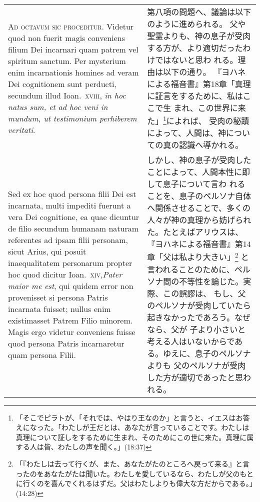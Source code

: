 \documentclass[10pt]{jsarticle} %
\begin{document}
\begin{longtable}{p{21em}p{21em}}

{\Huge A}{\scshape d octavum sic proceditur}. Videtur quod non fuerit magis conveniens
filium Dei incarnari quam patrem vel spiritum sanctum. Per mysterium
enim incarnationis homines ad veram Dei cognitionem sunt perducti,
secundum illud Ioan.~{\scshape xviii}, {\itshape in hoc natus sum, et ad hoc veni in mundum,
ut testimonium perhiberem veritati}.


 &

第八項の問題へ、議論は以下のように進められる。
父や聖霊よりも、神の息子が受肉する方が、より適切だったわけではないと思わ
 れる。理由は以下の通り。
『ヨハネによる福音書』第18章「真理に証言をするために、私はここで生
 まれ、この世界に来た」\footnote{「そこでピラトが、「それでは、やはり王なのか」と言うと、イエスはお答えになった。「わたしが王だとは、あなたが言っていることです。わたしは真理について証しをするために生まれ、そのためにこの世に来た。真理に属する人は皆、わたしの声を聞く。」(18:37)}によれば、
受肉の秘蹟によって、人間は、神についての真の認識へ導かれる。


 \\

Sed ex hoc quod persona filii Dei
est incarnata, multi impediti fuerunt a vera Dei cognitione, ea quae
dicuntur de filio secundum humanam naturam referentes ad ipsam filii
personam, sicut Arius, qui posuit inaequalitatem personarum propter hoc
quod dicitur Ioan.~{\scshape xiv},{\itshape  Pater maior me est}, qui quidem error non
provenisset si persona Patris incarnata fuisset; nullus enim
existimasset Patrem Filio minorem. Magis ergo videtur conveniens fuisse
quod persona Patris incarnaretur quam persona Filii.

&

しかし、神の息子が受肉したことによって、人間本性に即して息子について言わ
 れることを、息子のペルソナ自体へ関係させることで、多くの人々が神の真理から妨げられ
 た。たとえばアリウスは、『ヨハネによる福音書』第14章「父は私より大きい」\footnote{「『わたしは去って行くが、また、あなたがたのところへ戻って来る』と言ったのをあなたがたは聞いた。わたしを愛しているなら、わたしが父のもとに行くのを喜んでくれるはずだ。父はわたしよりも偉大な方だからである。」(14:28)}
 と言われることのために、ペルソナ間の不等性を論じた。実際、この誤謬は、
 もし、父のペルソナが受肉していたら起きなかったであろう。なぜなら、父が
 子より小さいと考える人はいないからである。ゆえに、息子のペルソナよりも
 父のペルソナが受肉した方が適切であったと思われる。


\end{longtable}
\end{document}
